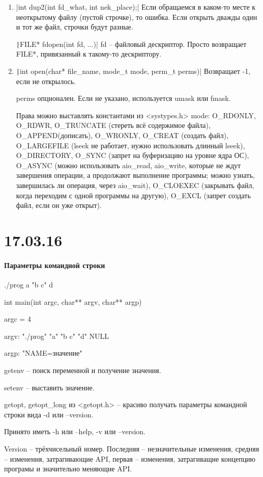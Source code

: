 \documentclass[a4paper,10pt]{article}
\newcommand{\ci}{\texttt}
\newcommand{\cl}{\mint{c}}
\begin{document}
\begin{enumerate}
\item \cl|int dup2(int fd_what, int nek_place);|
Если обращаемся в каком-то месте к неоткрытому файлу (пустой строчке), то ошибка. Если открыть дважды один и тот же файл, строчки будут разные.

\ci|FILE* fdopen(int fd, ...)| fd -- файловый дескриптор. Просто возвращает FILE*, привязанный к такому-то дескриптору.
\item \ci|int open(char* file_name, mode_t mode, perm_t perms)|
Возвращает -1, если не открылось.

perms опционален. Если не указано, используется umask или fmask.

Права можно выставлять константами из <systypes.h>
mode: O\_RDONLY, O\_RDWR, O\_TRUNCATE (стереть всё содержимое файла), O\_APPEND(дописать), O\_WRONLY, O\_CREAT (создать файл), O\_LARGEFILE (lseek не работает, нужно использовать длинный lseek), O\_DIRECTORY, O\_SYNC (запрет на буферизацию на уровне ядра ОС), O\_ASYNC (можно использовать aio\_read, aio\_write, которые не ждут завершения операции, а продолжают выполнение программы; можно узнать, завершилась ли операция, через aio\_wait), O\_CLOEXEC (закрывать файл, когда переходим с одной программы на другую), O\_EXCL (запрет создать файл, если он уже открыт).

\end{enumerate}

\section{17.03.16}
\paragraph{Параметры командной строки}
./prog a "b c" d

int main(int argc, char** argv, char** argp)

argc = 4

argv: "./prog" "a" "b c" "d" NULL

argp: "NAME=значение"

getenv -- поиск переменной и получение значения.

setenv -- выставить значение.

getopt, getopt\_long из <getopt.h> -- красиво получать параметры командной строки вида -d или --version.

Принято иметь -h или --help, -v или --version.

Version -- трёхчисельный номер. Последняя -- незначительные изменения, средняя -- изменения, затрагивающие API, первая -- изменения, затрагиващие концепцию програмы и значительно меняющие API.
\end{document}
